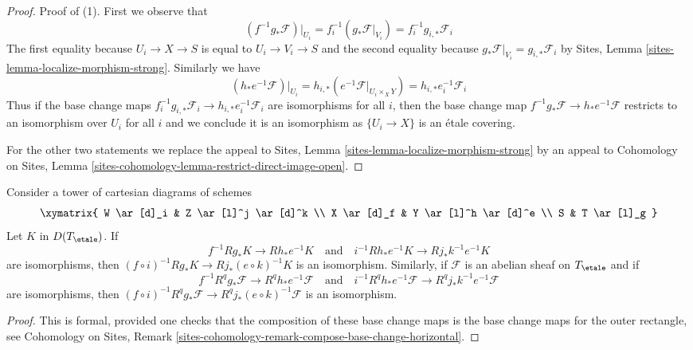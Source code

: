 \begin{proof}
Proof of (1). First we observe that
$$
(f^{-1}g_*\mathcal{F})|_{U_i} =
f_i^{-1}(g_*\mathcal{F}|_{V_i}) =
f_i^{-1}g_{i, *}\mathcal{F}_i
$$
The first equality because $U_i \to X \to S$ is equal to
$U_i \to V_i \to S$ and the second equality because
$g_*\mathcal{F}|_{V_i} = g_{i, *}\mathcal{F}_i$ by
Sites, Lemma \ref{sites-lemma-localize-morphism-strong}.
Similarly we have
$$
(h_*e^{-1}\mathcal{F})|_{U_i} =
h_{i, *}(e^{-1}\mathcal{F}|_{U_i \times_X Y}) =
h_{i, *}e_i^{-1}\mathcal{F}_i
$$
Thus if the base change maps
$f_i^{-1}g_{i, *}\mathcal{F}_i \to h_{i, *}e_i^{-1}\mathcal{F}_i$
are isomorphisms for all $i$, then the base change map
$f^{-1}g_*\mathcal{F} \to h_*e^{-1}\mathcal{F}$
restricts to an isomorphism over $U_i$ for all $i$
and we conclude it is an isomorphism as $\{U_i \to X\}$
is an \'etale covering.

\medskip\noindent
For the other two statements we replace the appeal to
Sites, Lemma \ref{sites-lemma-localize-morphism-strong}
by an appeal to
Cohomology on Sites, Lemma
\ref{sites-cohomology-lemma-restrict-direct-image-open}.
\end{proof}

\begin{lemma}
\label{lemma-base-change-compose}
Consider a tower of cartesian diagrams of schemes
$$
\xymatrix{
W \ar[d]_i & Z \ar[l]^j \ar[d]^k \\
X \ar[d]_f & Y \ar[l]^h \ar[d]^e \\
S & T \ar[l]_g
}
$$
Let $K$ in $D(T_\etale)$. If
$$
f^{-1}Rg_*K \to Rh_*e^{-1}K
\quad\text{and}\quad
i^{-1}Rh_*e^{-1}K \to Rj_*k^{-1}e^{-1}K
$$
are isomorphisms, then
$(f \circ i)^{-1}Rg_*K \to Rj_*(e \circ k)^{-1}K$
is an isomorphism.
Similarly, if $\mathcal{F}$ is an abelian sheaf on $T_\etale$ and if
$$
f^{-1}R^qg_*\mathcal{F} \to R^qh_*e^{-1}\mathcal{F}
\quad\text{and}\quad
i^{-1}R^qh_*e^{-1}\mathcal{F} \to R^qj_*k^{-1}e^{-1}\mathcal{F}
$$
are isomorphisms, then
$(f \circ i)^{-1}R^qg_*\mathcal{F} \to R^qj_*(e \circ k)^{-1}\mathcal{F}$
is an isomorphism.
\end{lemma}

\begin{proof}
This is formal, provided one checks that the composition of these
base change maps is the base change maps for the outer rectangle, see
Cohomology on Sites, Remark
\ref{sites-cohomology-remark-compose-base-change-horizontal}.
\end{proof}

